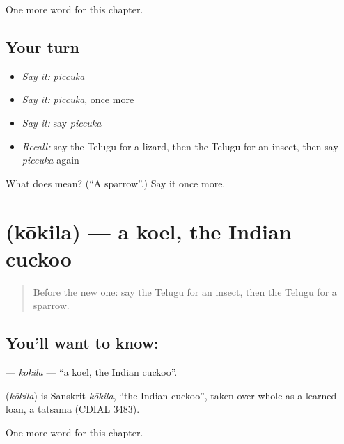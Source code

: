 \begin{grammarlens}[title={What you've built}]
One more word for this chapter.
\end{grammarlens}

\subsection*{Your turn}
\begin{itemize}
\raggedright
  \item \emph{Say it:} \emph{piccuka}
  \item \emph{Say it:} \emph{piccuka}, once more
  \item \emph{Say it:} say \emph{piccuka}
  \item \emph{Recall:} say the Telugu for a lizard, then the Telugu for an insect, then say \emph{piccuka} again
\end{itemize}

\begin{tcolorbox}[breakable,colback=teal!4,colframe=teal!35!black,title={Before you move on}]
What does  mean? (\textquotedblleft{}A sparrow\textquotedblright{}.) Say it once more.
\end{tcolorbox}
\section[\texorpdfstring{\te{కోకిల} (kōkila)}{కోకిల (kōkila)}]{ (kōkila) — a koel, the Indian cuckoo}

\label{lesson:TE-C187-kokila}



\begin{quote}
Before the new one: say the Telugu for an insect, then the Telugu for a sparrow.
\end{quote}

\subsection*{You'll want to know: }
\textbf{} — \emph{kōkila} — \textquotedblleft{}a koel, the Indian cuckoo\textquotedblright{}.

\begin{cousinweb}
\textbf{} (\emph{kōkila}) is Sanskrit \emph{kōkila}, \textquotedblleft{}the Indian cuckoo\textquotedblright{}, taken over whole as a learned loan, a tatsama (CDIAL 3483).
\end{cousinweb}

\begin{grammarlens}[title={What you've built}]
One more word for this chapter.
\end{grammarlens}

